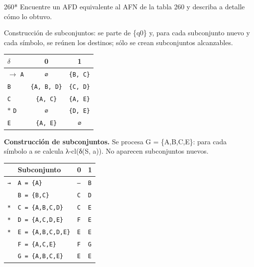 \documentclass[11pt]{article}
\begin{document}
\begin{ejercicio}{260}{*}
Encuentre un AFD equivalente al AFN de la tabla 260 y describa a detalle cómo lo obtuvo.
\end{ejercicio}
\proc Construcción de subconjuntos: se parte de \{q0\} y, para cada subconjunto nuevo y cada símbolo, se reúnen los destinos; sólo se crean subconjuntos alcanzables.
\begin{center}\small\begin{tabular}{lcc}\toprule
$\delta$ & 0 & 1 \\\midrule
$\to$ \texttt{A} & \texttt{∅} & \texttt{\{B, C\}} \\
 \texttt{B} & \texttt{\{A, B, D\}} & \texttt{\{C, D\}} \\
 \texttt{C} & \texttt{\{A, C\}} & \texttt{\{A, E\}} \\
$*$ \texttt{D} & \texttt{∅} & \texttt{\{D, E\}} \\
 \texttt{E} & \texttt{\{A, E\}} & \texttt{∅} \\
\bottomrule\end{tabular}\end{center}
\textbf{Construcción de subconjuntos.} Se procesa G = \{A,B,C,E\}: para cada símbolo a se calcula λ-cl(δ(S, a)). No aparecen subconjuntos nuevos.
\begin{center}\footnotesize\begin{tabular}{llll}\toprule
 & Subconjunto & 0 & 1 \\\midrule
\texttt{→} & \texttt{A = \{A\}} & \texttt{—} & \texttt{B} \\
\texttt{} & \texttt{B = \{B,C\}} & \texttt{C} & \texttt{D} \\
\texttt{*} & \texttt{C = \{A,B,C,D\}} & \texttt{C} & \texttt{E} \\
\texttt{*} & \texttt{D = \{A,C,D,E\}} & \texttt{F} & \texttt{E} \\
\texttt{*} & \texttt{E = \{A,B,C,D,E\}} & \texttt{E} & \texttt{E} \\
\texttt{} & \texttt{F = \{A,C,E\}} & \texttt{F} & \texttt{G} \\
\texttt{} & \texttt{G = \{A,B,C,E\}} & \texttt{E} & \texttt{E} \\
\bottomrule\end{tabular}\end{center}
\end{document}
